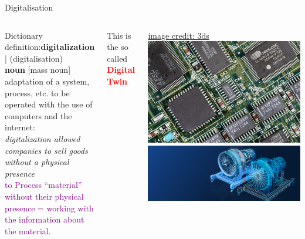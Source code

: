 \documentclass[aspectratio=169]{beamer}
\begin{document}
\begin{frame}{Digitalisation}
    \begin{columns}
        Dictionary definition:\textbf{digitalization} | (digitalisation)\\
        \textbf{noun} [mass noun]\\
        adaptation of a system, process, etc. to be operated with the use of computers and the internet: \\
        \textit{digitalization allowed companies to sell goods without a physical presence} \\

        \vspace{1em}
        \textcolor{purple}{to Process “material” without their physical presence = working with the information about the material.}

        \vspace{0.5em}
        This is the so called \textcolor{red}{\textbf{Digital Twin}}

        {\tiny  \href{https://www.3ds.com/products/delmia/virtual-twin-manufacturing}{image credit: 3ds}}
        \includegraphics[width=\linewidth]{media/circuit.png}\\[0.5em]
        \includegraphics[width=\linewidth]{media/digital_twin.png}
    \end{columns}
\end{frame}
\end{document}
